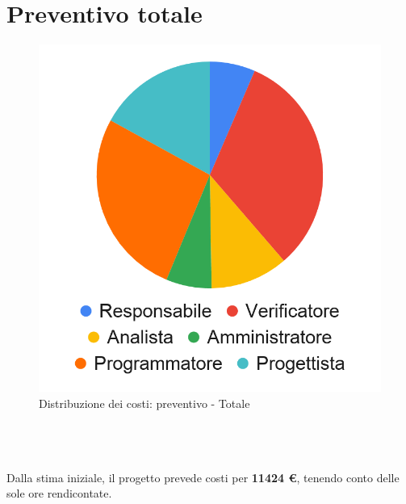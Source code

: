 \section{Preventivo totale}


\begin{minipage}{.60\textwidth}
	\smallPreventivoTable{
		
	}
\end{minipage}
\hspace{1cm}
\begin{minipage}{.30\textwidth}
	\begin{figure}[H]
		\includegraphics[scale=0.21]{res/images/charts/preventivo_priori/Grafico4-12.png}
		\caption{Distribuzione dei costi: preventivo - Totale}
	\end{figure}
\end{minipage} 
\\\\\\
Dalla stima iniziale, il progetto prevede costi per \textbf{11424 \euro}, tenendo conto delle sole ore rendicontate.